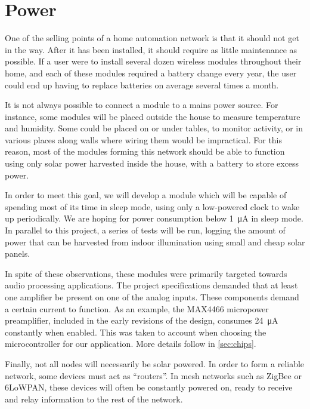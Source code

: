 \section{Power}\label{sec:power}

One of the selling points of a home automation network is that it should not get
in the way. After it has been installed, it should require as little maintenance
as possible. If a user were to install several dozen wireless modules throughout
their home, and each of these modules required a battery change every year, the
user could end up having to replace batteries on average several times a month. 

It is not always possible to connect a module to a mains power source. For
instance, some modules will be placed outside the house to measure temperature
and humidity. Some could be placed on or under tables, to monitor activity, or
in various places along walls where wiring them would be impractical. For this
reason, most of the modules forming this network should be able to function
using only solar power harvested inside the house, with a battery to store
excess power.

In order to meet this goal, we will develop a module which will be capable of
spending most of its time in sleep mode, using only a low-powered clock to wake
up periodically. We are hoping for power consumption below
\SI{1}{\micro\ampere} in sleep mode. In parallel to this project, a series of
tests will be run, logging the amount of power that can be harvested from indoor
illumination using small and cheap solar panels.

In spite of these observations, these modules were primarily targeted towards
audio processing applications. The project specifications demanded that at least
one amplifier be present on one of the analog inputs. These components demand
a certain current to function. As an example, the MAX4466 micropower
preamplifier, included in the early revisions of the design, consumes
\SI{24}{\micro\ampere} constantly when enabled. This was taken to account when
choosing the microcontroller for our application. More details follow in
\autoref{sec:chips}.

Finally, not all nodes will necessarily be solar powered. In order to form
a reliable network, some devices must act as ``routers''. In mesh networks such
as ZigBee or \ac{6LoWPAN}, these devices will often be constantly powered on,
ready to receive and relay information to the rest of the network.


